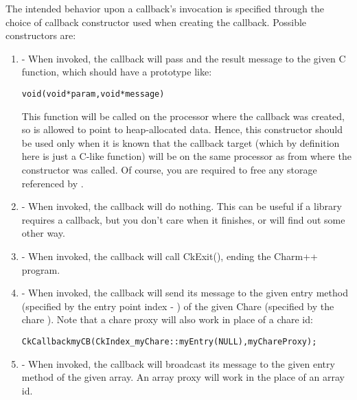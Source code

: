 The intended behavior upon a callback's invocation is specified
through the choice of callback constructor used when creating the callback. 
Possible constructors are: 

\begin{enumerate}
\item {} - 
When invoked, the callback will pass  and the result message
to the given C function, which should have a prototype
like:

\begin{alltt}
void (void *param, void *message)
\end{alltt}

This function will be called on the processor where the callback was created,
so  is allowed to point to heap-allocated data.  Hence, this 
constructor should be used only when it is known that the callback target (which by definition here
is just a C-like function) will be on the same processor as from where the constructor was called. 
Of course, you
are required to free any storage referenced by .

\item {} - When invoked, the callback
will do nothing.  This can be useful if a \charmpp{} library requires
a callback, but you don't care when it finishes, or will find out some
other way.

\item {} - When invoked, the callback
will call CkExit(), ending the Charm++ program.

\item {} - When invoked, the 
callback will send its message to the given entry method (specified by the 
entry point index - ) of the given
Chare (specified by the chare ).  Note that a chare proxy will also work in place of a chare id:

\begin{alltt}
	CkCallback myCB(CkIndex_myChare::myEntry(NULL), myChareProxy);
\end{alltt}

\item {} - 
When invoked,
the callback will broadcast its message to the given entry method
of the given array.  An array proxy will work in the place of an array id.


\end{enumerate}
